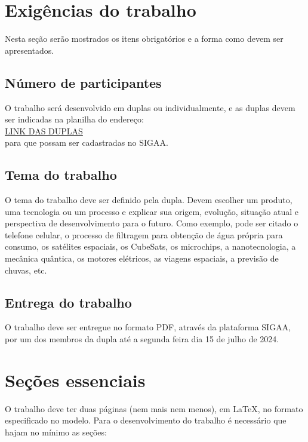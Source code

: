 \documentclass[conference]{ModeloA}
\begin{document}
\section{Exigências do trabalho}

Nesta seção serão mostrados os itens obrigatórios e a forma como devem ser apresentados.

\subsection{Número de participantes}
 O trabalho será desenvolvido em duplas ou individualmente, e as duplas devem ser indicadas na planilha do endereço:\\ 
  \href{https://docs.google.com/spreadsheets/d/1l2WnmjrgzaTikbDhNdt9FAAWOUk1IO63smh_fKgjOUs/edit?usp=sharing}{LINK DAS DUPLAS}\\ 
 para que possam ser cadastradas no SIGAA.

\subsection{Tema do trabalho}

O tema do trabalho deve ser definido pela dupla. Devem escolher um produto, uma tecnologia ou um processo e explicar sua origem, evolução, situação atual e perspectiva de desenvolvimento para o futuro. Como exemplo, pode ser citado o telefone celular, o processo de filtragem para obtenção de água própria para consumo, os satélites espaciais, os CubeSats, os microchips, a nanotecnologia, a mecânica quântica, os motores elétricos, as viagens espaciais, a previsão de chuvas, etc.

\subsection{Entrega do trabalho}

O trabalho deve ser entregue no formato PDF, através da plataforma SIGAA, por um dos membros da dupla até a segunda feira dia 15 de julho de 2024.

	
\section{Seções essenciais}

O trabalho deve ter duas páginas (nem mais nem menos), em \LaTeX, no formato especificado no modelo.
Para o desenvolvimento do trabalho é necessário que hajam no mínimo as seções:\\
\end{document}
